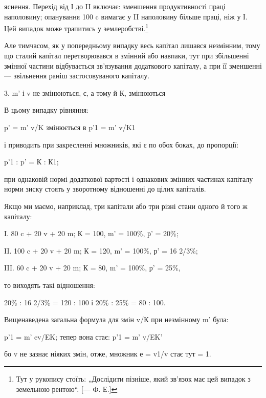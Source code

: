 \parcont{}  %
яснення. Перехід від І до II включає: зменшення продуктивності
праці наполовину; опанування 100 c вимагає у II наполовину
більше праці, ніж у І. Цей випадок може трапитись у землеробстві.\footnote{
Тут у рукопису стоїть: „Дослідити пізніше, який зв’язок має цей випадок
з земельною рентою“. [— Ф. Е.]
}

Але тимчасом, як у попередньому випадку весь капітал
лишався незмінним, тому що сталий капітал перетворювався
в змінний або навпаки, тут при збільшенні змінної частини відбувається
зв’язування додаткового капіталу, а при її зменшенні —
звільнення раніш застосовуваного капіталу.

3. m' і v не змінюються, с, а тому й К, змінюються

В цьому випадку рівняння:

p' = m' v/K змінюється в p'1 = m' v/K1

і приводить при закресленні множників, які є по обох боках,
до пропорції:

p'1 : p' = К : К1;

при однаковій нормі додаткової вартості і однакових змінних
частинах капіталу норми зиску стоять у зворотному відношенні
до цілих капіталів.

Якщо ми маємо, наприклад, три капітали або три різні стани
одного й того ж капіталу:

I. 80 c + 20 v + 20 m; К = 100, m' = 100\%, р' = 20\%;

II. 100 c + 20 v + 20 m; К = 120, m' = 100\%, р' = 16 2/3\%;

III. 60 c + 20 v + 20 m; К = 80, m' = 100\%, р' = 25\%,

то виходять такі відношення:

20\% : 16 2/3\% = 120 : 100 і 20\% : 25\% = 80 : 100.

Вищенаведена загальна формула для змін v/К при незмінному
m' була:

p'1 = m' ev/EK; тепер вона стає: p'1 = m' v/EK'

бо v не зазнає ніяких змін, отже, множник е = v1/v стає тут = 1.
